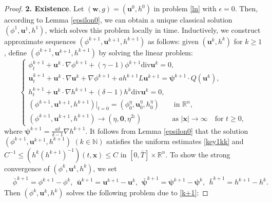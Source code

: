 \documentclass[11pt,reqno]{amsart}
\numberwithin{rk}{section}
\numberwithin{prop}{section}
\numberwithin{mydef}{section}
\numberwithin{lem}{section}
\numberwithin{equation}{section}
\numberwithin{thm}{section}
\begin{document}
\begin{proof}
\smallskip
\textbf{2. Existence}. Let $(\boldsymbol{w},g)=(\boldsymbol{u}^0, h^0)$ in problem  \eqref{ln} with $\epsilon=0$. Then, according to Lemma \ref{epsilon0},
we  can obtain a unique  classical solution $(\phi^1,\boldsymbol{u}^1,h^1)$, which solves this problem locally in time. Inductively, we construct approximate sequences $(\phi^{k+1},\boldsymbol{u}^{k+1},h^{k+1})$ as follows:
given $(\boldsymbol{u}^k, h^k)$ for $k\geq 1$, define  $(\phi^{k+1},\boldsymbol{u}^{k+1},h^{k+1})$ by solving the  linear problem:
\begin{equation}\label{k+1}
\begin{cases}
\displaystyle
\phi^{k+1}_t+\boldsymbol{u}^k\cdot\nabla\phi^{k+1}+(\gamma-1)\phi^{k+1}\mathrm{div}\boldsymbol{u}^k=0,\\[2pt]
\displaystyle
\boldsymbol{u}_t^{k+1}+\boldsymbol{u}^k\cdot\nabla \boldsymbol{u}^k+\nabla\phi^{k+1}+ah^{k+1}L\boldsymbol{u}^{k+1}
=\boldsymbol{\psi}^{k+1}\cdot Q(\boldsymbol{u}^k),\\[2pt]
\displaystyle
h^{k+1}_t+\boldsymbol{u}^k\cdot \nabla h^{k+1}+(\delta-1)h^k\mathrm{div}\boldsymbol{u}^k=0,\\[2pt]
\displaystyle
(\phi^{k+1},\boldsymbol{u}^{k+1},h^{k+1})|_{t=0}=(\phi^\eta_0,\boldsymbol{u}^\eta_0,h^\eta_0)
 \qquad \text{in $\mathbb{R}^n$}, \\[2pt]
\displaystyle
(\phi^{k+1},\boldsymbol{u}^{k+1},h^{k+1})\to (\eta,\boldsymbol{0},\eta^{2\iota}) \quad\quad \ \qquad \text{as $|\boldsymbol{x}|\to \infty$} \quad \text{for $t\geq 0$},
\end{cases}
\end{equation}
where $\boldsymbol{\psi}^{k+1}=\frac{a\delta}{\delta-1}\nabla h^{k+1}$.
It follows from Lemma \ref{epsilon0} that the solution  $(\phi^{k+1},\boldsymbol{u}^{k+1},h^{k+1})$ $(k\in \mathbb{N})$ satisfies  the uniform estimates \eqref{key1kk}  and $C^{-1}\leq (h^k(h^{k+1})^{-1})(t,\boldsymbol{x})\leq C$ in $[0,\bar{T}]\times\mathbb{R}^n$.
To show the strong convergence of $(\phi^k,\boldsymbol{u}^k,h^k)$, we set
\begin{equation*}
\begin{aligned}
&\bar{\phi}^{k+1}=\phi^{k+1}-\phi^k,\ \ \bar{\boldsymbol{u}}^{k+1}=\boldsymbol{u}^{k+1}-\boldsymbol{u}^k, \ \  \bar{\boldsymbol{\psi}}^{k+1}=\boldsymbol{\psi}^{k+1}-\boldsymbol{\psi}^k,\ \  \bar{h}^{k+1}=h^{k+1}-h^k.
\end{aligned}
\end{equation*}
Then $(\phi^k,\boldsymbol{u}^k,h^k)$ solves the following problem due to \eqref{k+1}: 

\end{proof}
\end{document}
